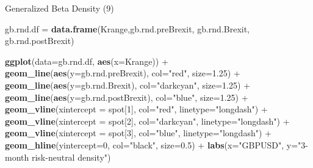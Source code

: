 \documentclass[ignorenonframetext,aspectratio=169]{beamer}
\newenvironment{Shaded}{}{}
\newcommand{\KeywordTok}[1]{\textcolor[rgb]{0.00,0.44,0.13}{\textbf{#1}}}
\newcommand{\DataTypeTok}[1]{\textcolor[rgb]{0.56,0.13,0.00}{#1}}
\newcommand{\DecValTok}[1]{\textcolor[rgb]{0.25,0.63,0.44}{#1}}
\newcommand{\FloatTok}[1]{\textcolor[rgb]{0.25,0.63,0.44}{#1}}
\newcommand{\StringTok}[1]{\textcolor[rgb]{0.25,0.44,0.63}{#1}}
\newcommand{\OperatorTok}[1]{\textcolor[rgb]{0.40,0.40,0.40}{#1}}
\newcommand{\NormalTok}[1]{#1}
\begin{document}
\begin{frame}[fragile]{Generalized Beta Density (9)}

\begin{Shaded}
\begin{Highlighting}[]
\NormalTok{gb.rnd.df =}\StringTok{ }\KeywordTok{data.frame}\NormalTok{(Krange,gb.rnd.preBrexit, }
\NormalTok{                       gb.rnd.Brexit, gb.rnd.postBrexit)}

\KeywordTok{ggplot}\NormalTok{(}\DataTypeTok{data=}\NormalTok{gb.rnd.df, }\KeywordTok{aes}\NormalTok{(}\DataTypeTok{x=}\NormalTok{Krange)) }\OperatorTok{+}\StringTok{ }
\StringTok{  }\KeywordTok{geom_line}\NormalTok{(}\KeywordTok{aes}\NormalTok{(}\DataTypeTok{y=}\NormalTok{gb.rnd.preBrexit), }\DataTypeTok{col=}\StringTok{"red"}\NormalTok{, }\DataTypeTok{size=}\FloatTok{1.25}\NormalTok{) }\OperatorTok{+}
\StringTok{  }\KeywordTok{geom_line}\NormalTok{(}\KeywordTok{aes}\NormalTok{(}\DataTypeTok{y=}\NormalTok{gb.rnd.Brexit), }\DataTypeTok{col=}\StringTok{"darkcyan"}\NormalTok{, }\DataTypeTok{size=}\FloatTok{1.25}\NormalTok{) }\OperatorTok{+}
\StringTok{  }\KeywordTok{geom_line}\NormalTok{(}\KeywordTok{aes}\NormalTok{(}\DataTypeTok{y=}\NormalTok{gb.rnd.postBrexit), }\DataTypeTok{col=}\StringTok{"blue"}\NormalTok{, }\DataTypeTok{size=}\FloatTok{1.25}\NormalTok{) }\OperatorTok{+}
\StringTok{  }\KeywordTok{geom_vline}\NormalTok{(}\DataTypeTok{xintercept =}\NormalTok{ spot[}\DecValTok{1}\NormalTok{], }\DataTypeTok{col=}\StringTok{"red"}\NormalTok{, }\DataTypeTok{linetype=}\StringTok{"longdash"}\NormalTok{) }\OperatorTok{+}\StringTok{ }
\StringTok{  }\KeywordTok{geom_vline}\NormalTok{(}\DataTypeTok{xintercept =}\NormalTok{ spot[}\DecValTok{2}\NormalTok{], }\DataTypeTok{col=}\StringTok{"darkcyan"}\NormalTok{, }\DataTypeTok{linetype=}\StringTok{"longdash"}\NormalTok{) }\OperatorTok{+}
\StringTok{  }\KeywordTok{geom_vline}\NormalTok{(}\DataTypeTok{xintercept =}\NormalTok{ spot[}\DecValTok{3}\NormalTok{], }\DataTypeTok{col=}\StringTok{"blue"}\NormalTok{, }\DataTypeTok{linetype=}\StringTok{"longdash"}\NormalTok{) }\OperatorTok{+}
\StringTok{  }\KeywordTok{geom_hline}\NormalTok{(}\DataTypeTok{yintercept=}\DecValTok{0}\NormalTok{, }\DataTypeTok{col=}\StringTok{"black"}\NormalTok{, }\DataTypeTok{size=}\FloatTok{0.5}\NormalTok{) }\OperatorTok{+}
\StringTok{  }\KeywordTok{labs}\NormalTok{(}\DataTypeTok{x=}\StringTok{"GBPUSD"}\NormalTok{, }\DataTypeTok{y=}\StringTok{"3-month risk-neutral density"}\NormalTok{)   }
\end{Highlighting}
\end{Shaded}

\end{frame}
\end{document}
